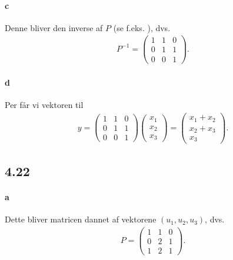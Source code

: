 			\paragraph{c} Denne bliver den inverse af $P$ (se f.eks. \cite[Eks. 4.4.13]{hesselholt2017}), dvs.
				\begin{align*}
					P^{-1}=\left(\begin{array}{rrr} {1} & {1} & {0} \\ {0} & {1} & {1} \\ {0} & {0} & {1} \end{array}\right).
				\end{align*}

			\paragraph{d} Per \cite[Eks. 4.4.18]{hesselholt2017} får vi vektoren til 
				\begin{align*}
					y = \left(\begin{array}{rrr} {1} & {1} & {0} \\ {0} & {1} & {1} \\ {0} & {0} & {1} \end{array}\right) \begin{pmatrix} x_1 \\ x_2 \\ x_3 \end{pmatrix} = \begin{pmatrix} x_1 + x_2 \\ x_2 + x_3 \\ x_3 \end{pmatrix}.
				\end{align*}

		\subsection{4.22}

			\paragraph{a} Dette bliver matricen dannet af vektorene $(u_1,u_2,u_3)$, dvs.
				\begin{align*}
					P=\left(\begin{array}{rrr} 1 & 1 & 0 \\ 0 & 2 & 1 \\ 1 & 2 & 1 \end{array}\right).
				\end{align*}

